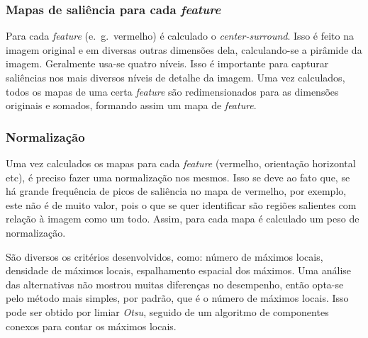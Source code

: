 \documentclass[11pt]{article}
\newcommand{\tit}[1]{\textit{#1}}
\newcommand{\eg}{e.~g.~}
\begin{document}
\subsubsection{Mapas de saliência para cada \tit{feature}}
Para cada \tit{feature} (\eg vermelho) é calculado o \tit{center-surround}.
Isso é feito na imagem original e em diversas outras dimensões dela,
calculando-se a pirâmide da imagem. Geralmente usa-se quatro níveis.
Isso é importante para capturar saliências nos mais diversos níveis de detalhe
da imagem. Uma vez calculados, todos os mapas de uma certa \tit{feature}
são redimensionados para as dimensões originais e somados, formando assim
um mapa de \tit{feature}.

\subsubsection{Normalização}
Uma vez calculados os mapas para cada \tit{feature} (vermelho,
orientação horizontal etc), é preciso fazer uma normalização nos mesmos.
Isso se deve ao fato que, se há grande frequência de picos de saliência
no mapa de vermelho, por exemplo, este não é de muito valor, pois o que se
quer identificar são regiões salientes com relação à imagem como um todo.
Assim, para cada mapa é calculado um peso de normalização.

São diversos os critérios desenvolvidos, como: número de máximos locais,
densidade de máximos locais, espalhamento espacial dos máximos.
Uma análise das alternativas não mostrou muitas diferenças no desempenho,
então opta-se pelo método mais simples, por padrão, que é o número de máximos
locais. Isso pode ser obtido por limiar \tit{Otsu}, seguido de um algoritmo
de componentes conexos para contar os máximos locais.
\end{document}

